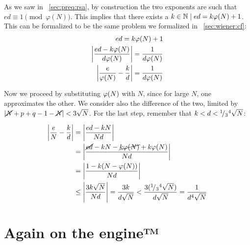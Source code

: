 As we saw in ~\ref{sec:preq:rsa}, by construction the two exponents are such that
$ed \equiv 1 \pmod{\varphi(N)}$. This implies that there exists a
$k \in \mathbb{N} \mid ed = k\varphi(N) + 1$. This can be formalized to be
the same problem we formalized in ~\ref{sec:wiener:cf}:
\begin{align*}
  ed = k\varphi(N) + 1 \\
  \left|\frac{ed - k\varphi(N)}{d\varphi(N)}\right| = \frac{1}{d\varphi(N)} \\
  \left|\frac{e}{\varphi(N)} - \frac{k}{d}\right| = \frac{1}{d\varphi(N)} \\
\end{align*}

Now we proceed by substituting $\varphi(N)$ with $N$, since for large $N$, one
approximates the other. We consider also the difference of the two, limited by
$\left|\cancel{N} + p + q - 1 - \cancel{N}\right| < 3\sqrt{N}$.
For the last step, remember that $k < d < {}^{1}\!/_{3} {}^4\sqrt{N}$:

\begin{align*}
  \left|\frac{e}{N} - \frac{k}{d}\right| &= \left|\frac{ed - kN}{Nd}\right| \\
  &= \left|\frac{\cancel{ed} -kN - \cancel{k\varphi(N)} + k\varphi(N)}{Nd}\right| \\
  &= \left|\frac{1-k(N-\varphi(N))}{Nd}\right| \\
  &\leq \left|\frac{3k\sqrt{N}}{Nd}\right|
  = \frac{3k}{d\sqrt{N}}
  < \frac{3({}^{1}\!/_{3} {}^4\sqrt{N})}{d\sqrt{N}}
  = \frac{1}{d{}^4\sqrt{N}}
\end{align*}

\section{Again on the engine™}

